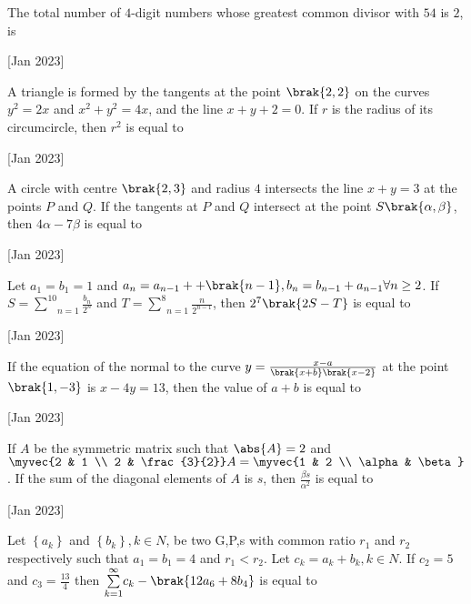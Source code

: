 \iffalse
	\title{2023}
	\author{AI24BTECH11003}
	\section{integer}
\fi
  
    \item The total number of $4$-digit numbers whose greatest common divisor with $54$ is $2$, is
    
    \hfill[Jan 2023]

    \item A triangle is formed by the tangents at the point $\brak{2,2}$ on the curves $y^2=2x$ and $x^2+y^2=4x$, and the line $x+y+2=0$. If $r$ is the radius of its circumcircle, then $r^2$ is equal to
    
    \hfill[Jan 2023]
		
    \item A circle with centre $\brak{2,3}$ and radius $4$ intersects the line $x+y=3$ at the points $P$ and $Q$. If the tangents at $P$ and $Q$ intersect at the point $S\brak{\alpha,\beta}$, then $4\alpha-7\beta$ is equal to
    
    \hfill[Jan 2023]

    \item Let $a_1=b_1=1$ and $a_n=a_{n-1}++\brak{n-1},b_n=b_{n-1}+a_{n-1}\forall n\geq2$. If $S=\underset{n=1}{\overset{10}{\sum}}\frac{b_n}{2^n}$ and $T=\underset{n=1}{\overset{8}{\sum}}\frac{n}{2^{n-1}}$, then $2^7\brak{2S-T}$ is equal to
    
    \hfill[Jan 2023]

    \item If the equation of the normal to the curve $y=\frac{x-a}{\brak{x+b}\brak{x-2}}$ at the point $\brak{1,-3}$ is $x-4y=13$, then the value of $a+b$ is equal to
    
    \hfill[Jan 2023]
        
    \item If $A$ be the symmetric matrix such that $\abs{A}=2$ and $\myvec{2 & 1 \\ 2 & \frac{3}{2}}A=\myvec{1 & 2 \\ \alpha & \beta}$. If the sum of the diagonal elements of $A$ is $s$, then $\frac{\beta s}{\alpha^2}$ is equal to 
    
    \hfill[Jan 2023]

    \item Let $\left\{ a_k\right\}$ and $\left\{ b_k\right\}, k\in N$, be two G,P,s with common ratio $r_1$ and $r_2$ respectively such that $a_1=b_1=4$ and $r_1<r_2$. Let $c_k=a_k+b_k,k\in N$. If $c_2=5$ and $c_3=\frac{13}{4}$ then $\underset{k=1}{\overset{\infty}{\sum}}c_k-\brak{12a_6+8b_4}$ is equal to
    

